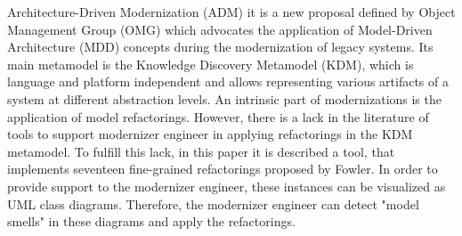 



Architecture-Driven Modernization (ADM) it is a new proposal defined by Object Management Group (OMG) which advocates the application of Model-Driven Architecture (MDD) concepts during the modernization of legacy systems. Its main metamodel is the Knowledge Discovery Metamodel (KDM), which is language and platform independent and allows representing various artifacts of a system at different abstraction levels. An intrinsic part of modernizations is the application of model refactorings. However, there is a lack in the literature of tools to support modernizer engineer in applying  refactorings in the KDM metamodel. To fulfill this lack, in this paper it is described a tool, that implements seventeen fine-grained refactorings proposed by Fowler. In order to provide support to the modernizer engineer, these instances can be visualized as UML class diagrams. Therefore, the modernizer engineer can detect  "model smells" in these diagrams and apply the refactorings.







